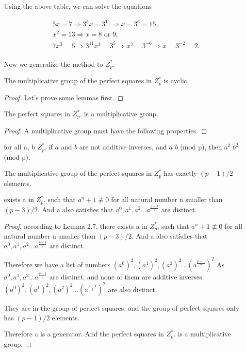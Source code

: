 \documentclass{article}
\begin{document}
\begin{example}
Using the above table, we can solve the equations
\end{example}
\begin{gather}
5x=7 \Rightarrow 3^5x=3^{11} \Rightarrow x=3^6=15,  \\
x^2=13 \Rightarrow x = 8 \text{ or } 9, \\ 
7x^3=5 \Rightarrow 3^{11}x^3=3^5 \Rightarrow x^3 = 3^{-6} \Rightarrow x = 3^{-2} = 2. \\
\end{gather}

Now we generalize the method to $Z^*_p.$
\begin{theorem}
The multiplicative group of the perfect squares in $Z^*_p$ is cyclic.
\end{theorem}

\begin{proof}
Let's prove some lemmas first.
 \end{proof}
 
\begin{lemma}
The perfect squares in $Z^*_p.$ is a multiplicative group.
\end{lemma}

\begin{proof}
A multiplicative group must have the following properties.
 \end{proof}
 
  \begin{lemma}
for all a, b \in $Z^*_p$, if $a$ and $b$ are not additive inverses, and $a$ \not \equiv $b$ (mod p), then $a^2$ \not \equiv $b^2$ (mod p). 
\end{lemma}
 
 \begin{lemma}
The multiplicative group of the perfect squares in $Z^*_p$ has exactly $(p-1)/2$ elements.
\end{lemma}

 \begin{lemma}
exists a in $Z^*_p$, such that $a^n + 1 \not \equiv 0$ for all natural number n smaller than $(p-3)/2$. And a also satisfies that $a^0, a^1, a^2...a^\frac{p-1}{2}$ are distinct.
\end{lemma}

\begin{proof}
according to Lemma 2.7, there exists a in $Z^*_p$, such that $a^n + 1 \not \equiv 0$ for all natural number n smaller than $(p-3)/2$. And a also satisfies that $a^0, a^1, a^2...a^\frac{p-1}{2}$ are distinct.

Therefore we have a list of numbers
$(a^0)^2, (a^1)^2, (a^2)^2...(a^\frac{p-1}{2})^2$ 
As $a^0, a^1, a^2...a^\frac{p-1}{2}$ are distinct, and none of them are additive inverses. $(a^0)^2, (a^1)^2, (a^2)^2...(a^\frac{p-1}{2})^2$ are also distinct.

They are in the group of perfect squares.
and the group of perfect squares only has
$(p-1)/2$ elements. 

Therefore a is a generator. And the perfect squares in $Z^*_p.$ is a multiplicative group.
 \end{proof}
\end{document}
